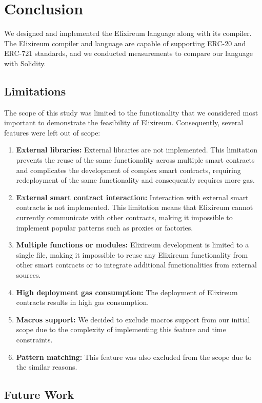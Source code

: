 \chapter{Conclusion}

We designed and implemented the Elixireum language along with its compiler. The Elixireum compiler and language are capable of supporting ERC-20 and ERC-721 standards, and we conducted measurements to compare our language with Solidity.

\section{Limitations}

The scope of this study was limited to the functionality that we considered most important to demonstrate the feasibility of Elixireum. Consequently, several features were left out of scope:

\begin{enumerate}
\item \textbf{External libraries:} External libraries are not implemented. This limitation prevents the reuse of the same functionality across multiple smart contracts and complicates the development of complex smart contracts, requiring redeployment of the same functionality and consequently requires more gas.
\item \textbf{External smart contract interaction:} Interaction with external smart contracts is not implemented. This limitation means that Elixireum cannot currently communicate with other contracts, making it impossible to implement popular patterns such as proxies or factories.
\item \textbf{Multiple functions or modules:} Elixireum development is limited to a single file, making it impossible to reuse any Elixireum functionality from other smart contracts or to integrate additional functionalities from external sources.
\item \textbf{High deployment gas consumption:} The deployment of Elixireum contracts results in high gas consumption.
\item \textbf{Macros support:} We decided to exclude macros support from our initial scope due to the complexity of implementing this feature and time constraints.
\item \textbf{Pattern matching:} This feature was also excluded from the scope due to the similar reasons.
\end{enumerate}

\section{Future Work}

